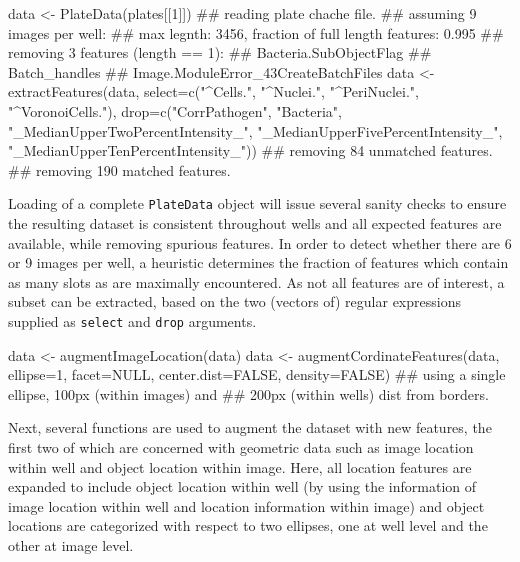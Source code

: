 \begin{rflow}
data <- PlateData(plates[[1]])
## reading plate chache file.
## assuming 9 images per well:
## max legnth: 3456, fraction of full length features: 0.995
## removing 3 features (length == 1):
##   Bacteria.SubObjectFlag
##   Batch_handles
##   Image.ModuleError_43CreateBatchFiles
data <- extractFeatures(data,
                        select=c("^Cells.", "^Nuclei.", "^PeriNuclei.",
                                 "^VoronoiCells."),
                        drop=c("CorrPathogen", "Bacteria",
                               "_MedianUpperTwoPercentIntensity_",
                               "_MedianUpperFivePercentIntensity_",
                               "_MedianUpperTenPercentIntensity_"))
## removing 84 unmatched features.
## removing 190 matched features.

\end{rflow}



Loading of a complete \texttt{PlateData} object will issue several sanity checks to ensure the resulting dataset is consistent throughout wells and all expected features are available, while removing spurious features. In order to detect whether there are 6 or 9 images per well, a heuristic determines the fraction of features which contain as many slots as are maximally encountered. As not all features are of interest, a subset can be extracted, based on the two (vectors of) regular expressions supplied as \texttt{select} and \texttt{drop} arguments. 

\begin{rflow}
data <- augmentImageLocation(data)
data <- augmentCordinateFeatures(data, ellipse=1, facet=NULL,
                                 center.dist=FALSE, density=FALSE)
## using a single ellipse, 100px (within images) and 
## 200px (within wells) dist from borders.

\end{rflow}


Next, several functions are used to augment the dataset with new features, the first two of which are concerned with geometric data such as image location within well and object location within image. Here, all location features are expanded to include object location within well (by using the information of image location within well and location information within image) and object locations are categorized with respect to two ellipses, one at well level and the other at image level.

